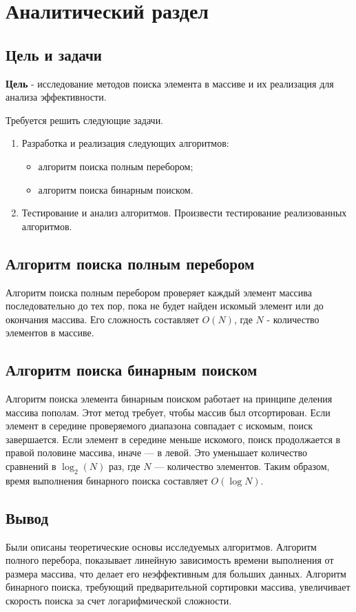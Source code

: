 \chapter{Аналитический раздел}

\section{Цель и задачи}
\textbf{Цель} - исследование методов поиска элемента в массиве и их реализация для анализа эффективности.

Требуется решить следующие задачи.
\begin{enumerate}[label=\arabic*)]
	\item {Разработка и реализация следующих алгоритмов:}
	\begin{itemize}[label=---]
		\item алгоритм поиска полным перебором;
		\item алгоритм поиска бинарным поиском.
	\end{itemize}
	\item {Тестирование и анализ алгоритмов}. Произвести тестирование реализованных алгоритмов.
\end{enumerate}


\section{Алгоритм поиска полным перебором}
Алгоритм поиска полным перебором проверяет каждый элемент массива последовательно до тех пор, пока не будет найден искомый элемент или до окончания массива. Его сложность составляет \( O(N) \), где \( N \) - количество элементов в массиве.

\section{Алгоритм поиска бинарным поиском}
Алгоритм поиска элемента бинарным поиском работает на принципе деления массива пополам. Этот метод требует, чтобы массив был отсортирован. Если элемент в середине проверяемого диапазона совпадает с искомым, поиск завершается. Если элемент в середине меньше искомого, поиск продолжается в правой половине массива, иначе — в левой. Это уменьшает количество сравнений в \( \log_2(N) \) раз, где \( N \) — количество элементов. Таким образом, время выполнения бинарного поиска составляет \( O(\log N) \).


\section{Вывод}
Были описаны теоретические основы исследуемых алгоритмов. Алгоритм полного перебора, показывает линейную зависимость времени выполнения от размера массива, что делает его неэффективным для больших данных. Алгоритм бинарного поиска, требующий предварительной сортировки массива, увеличивает скорость поиска за счет логарифмической сложности.
